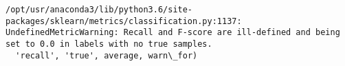 \documentclass[11pt]{article}
\begin{document}
    \begin{Verbatim}[commandchars=\\\{\}]
/opt/usr/anaconda3/lib/python3.6/site-packages/sklearn/metrics/classification.py:1137: UndefinedMetricWarning: Recall and F-score are ill-defined and being set to 0.0 in labels with no true samples.
  'recall', 'true', average, warn\_for)

    \end{Verbatim}


    
    
    
    
\end{document}

